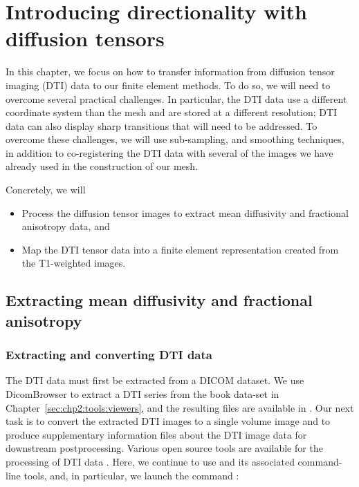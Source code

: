 \chapter{Introducing directionality with diffusion tensors}
\label{chap:dti}
In this chapter, we focus on how to transfer information from
diffusion tensor imaging (DTI) data to our finite element
methods. To do so, we will need to overcome several practical
challenges. In particular, the DTI data use a different coordinate
system than the mesh and are stored at a different resolution; DTI
data can also display sharp transitions that will need to be
addressed. To overcome these challenges, we will use sub-sampling, and
smoothing techniques, in addition to co-registering the DTI data with
several of the images we have already used in the construction of our
mesh.  

Concretely, we will
\begin{itemize}
\item
  Process the diffusion tensor images to extract mean diffusivity and
  fractional anisotropy data, and
\item
  Map the DTI tensor data into a finite element representation created from
  the T1-weighted images.
\end{itemize}

\section{Extracting mean diffusivity and fractional anisotropy}

\subsection{Extracting and converting DTI data}
\label{sec:chp-dti:extract-and-convert}
The DTI data must first be extracted from a DICOM dataset. We use
DicomBrowser to extract a DTI series from the book data-set in
Chapter~\ref{sec:chp2:tools:viewers}, and the resulting files are
available in . Our next task is to convert the
extracted DTI images to a single volume image and to produce
supplementary information files about the DTI image data for
downstream postprocessing.  Various open source tools are available
for the processing of DTI data \cite{soares2013hitchhiker}. Here, we
continue to use \freesurfer{} and its associated command-line tools,
and, in particular, we launch the command :

